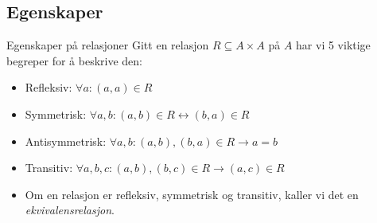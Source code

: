 \subsection{Egenskaper}
\begin{frame}[fragile]{Egenskaper på relasjoner}
Gitt en relasjon $R \subseteq A \times A$ på $A$ har vi 5 viktige begreper for å beskrive den:
    \begin{itemize}
        \item Refleksiv: $\forall a : (a, a) \in R$
        \pause
        \item Symmetrisk: $\forall a, b : (a, b) \in R \leftrightarrow (b, a) \in R$
        \pause
        \item Antisymmetrisk: $\forall a, b : (a, b), (b, a) \in R \rightarrow a = b$
        \pause
        \item Transitiv: $\forall a, b, c : (a, b), (b, c) \in R \rightarrow (a, c) \in R$\\
        \pause
        \item Om en relasjon er refleksiv, symmetrisk og transitiv, kaller vi det en \emph{ekvivalensrelasjon}.
    \end{itemize}   
\end{frame}

